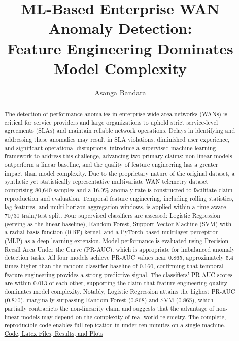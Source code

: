 \documentclass{article}
\title{ML-Based Enterprise WAN Anomaly Detection: \\
Feature Engineering Dominates Model Complexity}
\author{Asanga Bandara}
\begin{document}
\maketitle

\begin{abstract}
The detection of performance anomalies in enterprise wide area networks (WANs) is critical 
for service providers and large organizations to uphold strict service-level agreements (SLAs) 
and maintain reliable network operations. Delays in identifying and addressing these anomalies 
may result in SLA violations, diminished user experience, and significant operational 
disruptions. \citep{schummer2024} introduce a supervised machine learning framework to 
address this challenge, advancing two primary claims: non-linear models outperform a linear 
baseline, and the quality of feature engineering has a greater impact than model complexity. 
Due to the proprietary nature of the original dataset, a synthetic yet statistically 
representative multivariate WAN telemetry dataset comprising 80{,}640 samples and a 16.0\% anomaly 
rate is constructed to facilitate claim reproduction and evaluation. Temporal feature 
engineering, including rolling statistics, lag features, and multi-horizon aggregation windows, 
is applied within a time-aware 70/30 train/test split. Four supervised classifiers are assessed: 
Logistic Regression (serving as the linear baseline), Random Forest, Support Vector Machine (SVM) 
with a radial basis function (RBF) kernel, and a PyTorch-based multilayer perceptron (MLP) as a 
deep learning extension. Model performance is evaluated using Precision-Recall Area Under the 
Curve (PR-AUC), which is appropriate for imbalanced anomaly detection tasks. All four models 
achieve PR-AUC values near 0.865, approximately 5.4 times higher than the random-classifier 
baseline of 0.160, confirming that temporal feature engineering provides a strong predictive 
signal. The classifiers' PR-AUC scores are within 0.013 of each other, supporting the claim that 
feature engineering quality dominates model complexity. Notably, Logistic Regression attains the 
highest PR-AUC (0.870), marginally surpassing Random Forest (0.868) and SVM (0.865), which 
partially contradicts the non-linearity claim and suggests that the advantage of non-linear 
models may depend on the complexity of real-world telemetry. The complete, reproducible code 
enables full replication in under ten minutes on a single machine.\\
\href{https://github.com/asbandara/wan_anomaly_repo}{Code, Latex Files, Results, and Plots}
\end{abstract}
\end{document}
